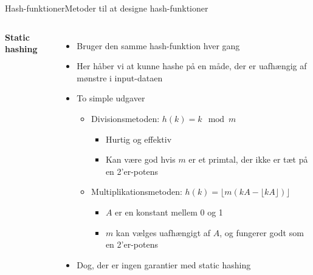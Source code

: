 \documentclass[aspectratio=1610]{beamer}
\begin{document}
\begin{frame}{Hash-funktioner}{Metoder til at designe hash-funktioner}

    \begin{columns}[t]
        \textbf{Static hashing}
        \begin{itemize}[<+(1)->]
            \small
            \item Bruger den samme hash-funktion hver gang
            \item Her håber vi at kunne hashe på en måde, der er uafhængig af
                mønstre i input-dataen
            \item To simple udgaver
                \begin{itemize}
                    \item \alert{Divisionsmetoden}: $h(k) = k \mod m$
                        \begin{itemize}
                            \item Hurtig og effektiv
                            \item Kan være god hvis $m$ er et primtal, der ikke
                                er tæt på en 2'er-potens
                        \end{itemize}
                    \item \alert{Multiplikationsmetoden}: $h(k) = \lfloor
                        m(kA-\lfloor kA \rfloor)\rfloor$
                        \begin{itemize}
                            \item $A$ er en konstant mellem 0 og 1
                            \item $m$ kan vælges uafhængigt af $A$, og fungerer
                                godt som en 2'er-potens
                        \end{itemize}
                \end{itemize}
            \item Dog, der er ingen garantier med static hashing
        \end{itemize}    
    

\end{columns}
\end{frame}
\end{document}

